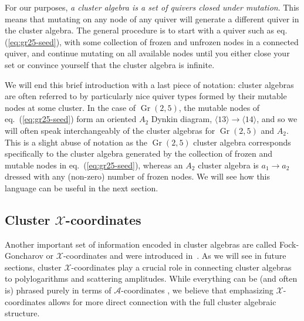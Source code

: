 \documentclass[11pt]{article}
\DeclareMathOperator{\Gr}{Gr}
\def\ket#1{\langle #1 \rangle}
\def\x{\mathcal{X}}
\def\xcoords{$\mathcal{X}$-coordinates }
\def\acoords{$\mathcal{A}$-coordinates }
\begin{document}
For our purposes, \emph{a cluster algebra is a set of quivers closed under mutation}. This means that mutating on any node of any quiver will generate a different quiver in the cluster algebra. The general procedure is to start with a quiver such as eq. (\ref{eq:gr25-seed}), with some collection of frozen and unfrozen nodes in a connected quiver, and continue mutating on all available nodes until you either close your set or convince yourself that the cluster algebra is infinite. 

We will end this brief introduction with a last piece of notation: cluster algebras are often referred to by particularly nice quiver types formed by their mutable nodes at some cluster. In the case of $\Gr(2,5)$, the mutable nodes of eq.~(\ref{eq:gr25-seed}) form an oriented $A_2$ Dynkin diagram, $\ket{13}\to\ket{14}$, and so we will often speak interchangeably of the cluster algebras for $\Gr(2,5)$ and $A_2$. This is a slight abuse of notation as the $\Gr(2,5)$ cluster algebra corresponds specifically to the cluster algebra generated by the collection of frozen and mutable nodes in eq.~(\ref{eq:gr25-seed}), whereas an $A_2$ cluster algebra is $a_1 \to a_2$ dressed with any (non-zero) number of frozen nodes. We will see how this language can be useful in the next section.

\subsection{Cluster \texorpdfstring{$\mathcal{X}$}{X}-coordinates}

Another important set of information encoded in cluster algebras are called Fock-Goncharov or $\x$-coordinates and were introduced in~\cite{FG03b}. As we will see in future sections, cluster \xcoords play a crucial role in connecting cluster algebras to polylogarithms and scattering amplitudes. While everything can be (and often is) phrased purely in terms of \acoords, we believe that emphasizing \xcoords allows for more direct connection with the full cluster algebraic structure. 
\end{document}
